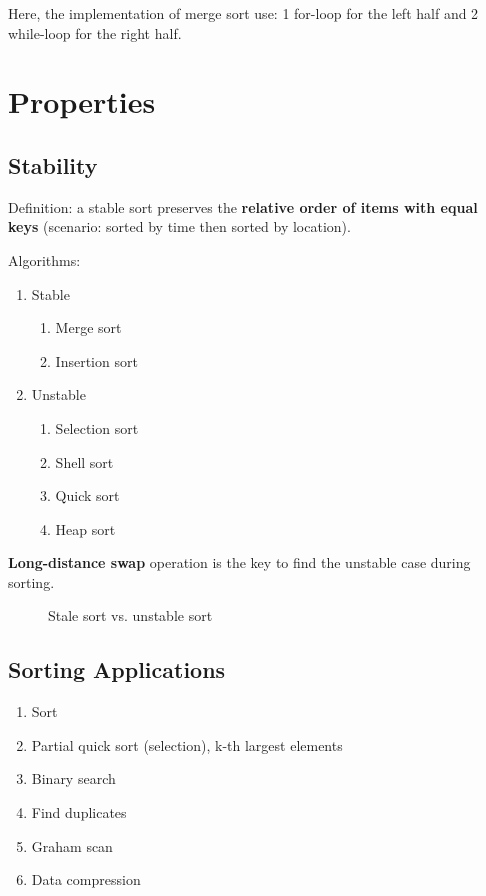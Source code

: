 Here, the implementation of merge sort use: 1 for-loop for the left half and 2 while-loop for the right half.

\section{Properties}
\subsection{Stability}
Definition: a stable sort preserves the \textbf{relative order of items with equal keys} (scenario: sorted by time then sorted by location). 

Algorithms:
\begin{enumerate}
\item Stable
\begin{enumerate}
\item Merge sort
\item Insertion sort
\end{enumerate} 
\item Unstable
\begin{enumerate}
\item Selection sort
\item Shell sort
\item Quick sort
\item Heap sort
\end{enumerate}
\end{enumerate}
\textbf{Long-distance swap} operation is the key to find the unstable case during sorting. 
\begin{figure}[hbtp]
\centering
{}
\caption{Stale sort vs. unstable sort}
\label{fig:trie} 
\end{figure}

\subsection{Sorting Applications}
\begin{enumerate}
\item Sort
\item Partial quick sort (selection), k-th largest elements 
\item Binary search
\item Find duplicates 
\item Graham scan
\item Data compression
\end{enumerate}

